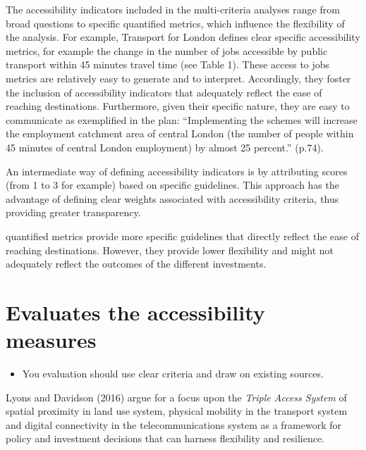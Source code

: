 \documentclass[12pt,]{article}
\providecommand{\tightlist}{%
  \setlength{\itemsep}{0pt}\setlength{\parskip}{0pt}}
\begin{document}
The accessibility indicators included in the multi-criteria analyses
range from broad questions to specific quantified metrics, which
influence the flexibility of the analysis. For example, Transport for
London defines clear specific accessibility metrics, for example the
change in the number of jobs accessible by public transport within 45
minutes travel time (see Table 1). These access to jobs metrics are
relatively easy to generate and to interpret. Accordingly, they foster
the inclusion of accessibility indicators that adequately reflect the
ease of reaching destinations. Furthermore, given their specific nature,
they are easy to communicate as exemplified in the plan: ``Implementing
the schemes will increase the employment catchment area of central
London (the number of people within 45 minutes of central London
employment) by almost 25 percent.'' (p.74).

An intermediate way of defining accessibility indicators is by
attributing scores (from 1 to 3 for example) based on specific
guidelines. This approach has the advantage of defining clear weights
associated with accessibility criteria, thus providing greater
transparency.

quantified metrics provide more specific guidelines that directly
reflect the ease of reaching destinations. However, they provide lower
flexibility and might not adequately reflect the outcomes of the
different investments.

\hypertarget{evaluates-the-accessibility-measures}{%
\section{Evaluates the accessibility
measures}\label{evaluates-the-accessibility-measures}}

\begin{itemize}
\tightlist
\item
  You evaluation should use clear criteria and draw on existing sources.
\end{itemize}

Lyons and Davidson (2016) argue for a focus upon the \emph{Triple Access
System} of spatial proximity in land use system, physical mobility in
the transport system and digital connectivity in the telecommunications
system as a framework for policy and investment decisions that can
harness flexibility and resilience.
\end{document}
